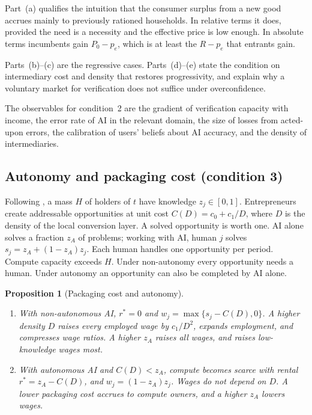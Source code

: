 \documentclass[12pt]{article}
\newtheorem{proposition}{Proposition}
\theoremstyle{remark}
\begin{document}
Part~(a) qualifies the intuition that the consumer surplus from a new good accrues mainly to previously rationed households. In relative terms it does, provided the need is a necessity and the effective price is low enough. In absolute terms incumbents gain $P_0-p_e$, which is at least the $R-p_e$ that entrants gain.

Parts~(b)--(c) are the regressive cases. Parts~(d)--(e) state the condition on intermediary cost and density that restores progressivity, and explain why a voluntary market for verification does not suffice under overconfidence.

The observables for condition~2 are the gradient of verification capacity with income, the error rate of AI in the relevant domain, the size of losses from acted-upon errors, the calibration of users' beliefs about AI accuracy, and the density of intermediaries.

\subsection{Autonomy and packaging cost (condition 3)}\label{sec:autonomy}

Following \citet{garicano2026comment}, a mass $H$ of holders of $t$ have knowledge $z_j\in[0,1]$. Entrepreneurs create addressable opportunities at unit cost $C(D)=c_0+c_1/D$, where $D$ is the density of the local conversion layer. A solved opportunity is worth one. AI alone solves a fraction $z_A$ of problems; working with AI, human $j$ solves $s_j=z_A+(1-z_A)z_j$. Each human handles one opportunity per period. Compute capacity exceeds $H$. Under non-autonomy every opportunity needs a human. Under autonomy an opportunity can also be completed by AI alone.

\begin{proposition}[Packaging cost and autonomy]\label{prop:autonomy}
\begin{enumerate}[label=(\roman*),itemsep=0pt]
\item With non-autonomous AI, $r^*=0$ and $w_j=\max\{s_j-C(D),0\}$. A higher density $D$ raises every employed wage by $c_1/D^2$, expands employment, and compresses wage ratios. A higher $z_A$ raises all wages, and raises low-knowledge wages most.
\item With autonomous AI and $C(D)<z_A$, compute becomes scarce with rental $r^*=z_A-C(D)$, and $w_j=(1-z_A)z_j$. Wages do not depend on $D$. A lower packaging cost accrues to compute owners, and a higher $z_A$ lowers wages.
\end{enumerate}
\end{proposition}
\end{document}
